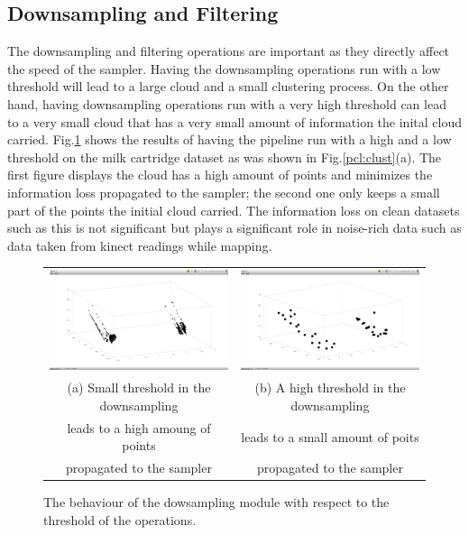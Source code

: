 \documentclass[twoside,hidelinks]{article}
\begin{document}
\subsection{Downsampling and Filtering}

The downsampling and filtering operations are important as they directly affect the speed of the sampler. Having the downsampling operations run with a low threshold will lead to a large cloud and a small clustering process. On the other hand, having downsampling operations run with a very high threshold can lead to a very small cloud that has a very small amount of information the inital cloud carried. Fig.\ref{pip:downsample} shows the results of having the pipeline run with a high and a low threshold on the milk cartridge dataset as was shown in Fig.\ref{pcl:clust}(a). The first figure displays the cloud has a high amount of points and minimizes the information loss propagated to the sampler; the second one only keeps a small part of the points the initial cloud carried. The information loss on clean datasets such as this is not significant but plays a significant role in noise-rich data such as data taken from kinect readings while mapping.


\begin{figure}[!ht]
\begin{tabular}{cc}
    \includegraphics[width=.4\textwidth]{smalldownsamplinglimit} &  \includegraphics[width=.4\textwidth]{largedownsamplinglimit} \\
    (a) Small threshold in the downsampling  & (b) A high threshold in the downsampling  \\
        leads to  a high amoung of points    &     leads to a small amount of poits \\
        propagated to the sampler            &     propagated to the sampler  \\[6pt]
\end{tabular}
\caption{The behaviour of the dowsampling module with respect to the threshold of the operations.}
  \label{pip:downsample}
\end{figure}
\end{document}
